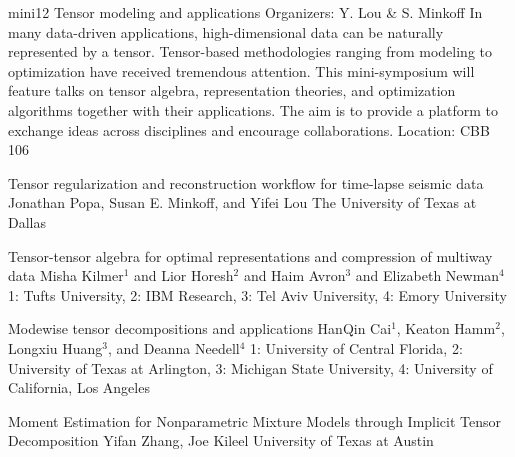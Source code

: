 \mini
{mini12}
{Tensor modeling and applications}
{Organizers: Y. Lou \& S. Minkoff}
{In many data-driven applications, high-dimensional data can be naturally represented by a tensor. Tensor-based methodologies ranging from modeling to optimization have received tremendous attention.  This mini-symposium will feature talks on tensor algebra, representation theories, and optimization algorithms together with their applications. The aim is to provide a platform to exchange ideas across disciplines and encourage collaborations.}
{Location: CBB 106}

\begin{talks}
\item\talk
{Tensor regularization and reconstruction workflow for time-lapse seismic data}
{Jonathan Popa, Susan E. Minkoff, and Yifei Lou}
{The University of Texas at Dallas}
\item\talk
{Tensor-tensor algebra for optimal representations and compression of multiway data}
{Misha Kilmer$^{1}$ and Lior Horesh$^{2}$ and Haim Avron$^{3}$ and Elizabeth Newman$^{4}$}
{1: Tufts University, 2: IBM Research, 3: Tel Aviv University, 4: Emory University}
\item\talk
{Modewise tensor decompositions and applications}
{HanQin Cai$^{1}$, Keaton Hamm$^{2}$, Longxiu Huang$^{3}$, and Deanna Needell$^{4}$}
{1: University of Central Florida, 2: University of Texas at Arlington, 3: Michigan State University, 4: University of California, Los Angeles}
\item\talk
{Moment Estimation for Nonparametric Mixture Models through Implicit Tensor Decomposition}
{Yifan Zhang, Joe Kileel}
{University of Texas at Austin}
\end{talks}
\room
